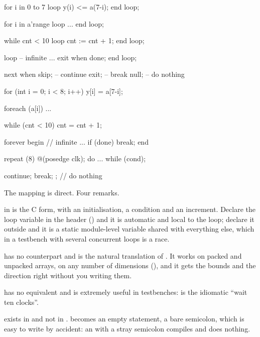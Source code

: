 \begin{rosetta}
\begin{rleft}
for i in 0 to 7 loop
  y(i) <= a(7-i);
end loop;

for i in a'range loop
  ...
end loop;

while cnt < 10 loop
  cnt := cnt + 1;
end loop;

loop                -- infinite
  ...
  exit when done;
end loop;

next when skip;     -- continue
exit;               -- break
null;               -- do nothing
\end{rleft}
\begin{rright}
for (int i = 0; i < 8; i++)
  y[i] = a[7-i];

foreach (a[i])
  ...

while (cnt < 10)
  cnt = cnt + 1;

forever begin       // infinite
  ...
  if (done) break;
end

repeat (8) @(posedge clk);
do ... while (cond);

continue;
break;
;                   // do nothing
\end{rright}
\end{rosetta}


The mapping is direct. Four remarks.

 in \SV{} is the C form, with an initialisation, a condition and an
increment. Declare the loop variable in the header ()
and it is automatic and local to the loop; declare it outside and it is a
static module-level variable shared with everything else, which in a
testbench with several concurrent loops is a race.

 has no \VHDL{} counterpart and is the natural translation of
. It works on packed and unpacked arrays, on any
number of dimensions (), and it gets the bounds and the
direction right without you writing them.

 has no \VHDL{} equivalent and is extremely useful in
testbenches:  is the idiomatic ``wait ten
clocks''.

 exists in \SV{} and not in \VHDL{}.  becomes an
empty statement, a bare semicolon, which is easy to write by accident: an
 with a stray semicolon compiles and does nothing.

